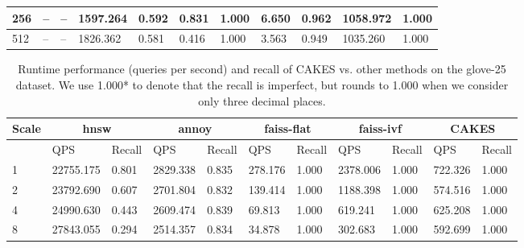 \begin{table}[!t]
\begin{center}
\begin{small}
\begin{sc}
\begin{tabular}{|l|p{1cm}|p{1cm}|p{1cm}|p{1cm}|p{1cm}|p{1cm}|p{1cm}|p{1cm}|p{1cm}|p{1cm}|}
                    \hline
                    256 & -- & -- & 1597.264 & 0.592 & 0.831 & 1.000 & 6.650 & 0.962 & 1058.972 & 1.000 \\
                    \hline
                    512 & -- & -- & 1826.362 & 0.581 & 0.416 & 1.000 & 3.563 & 0.949 & 1035.260 & 1.000 \\
                    \hline
                \end{tabular}
            \end{sc}
        \end{small}
    \end{center}
    \vskip -0.1in
\end{table}


\begin{table}[!t]
    \caption{Runtime performance (queries per second) and recall of CAKES vs. other methods on the glove-25 dataset. We use 1.000* to denote that the recall is imperfect, but rounds to 1.000 when we consider only three decimal places.}
    \label{table:results:ann-fashion}
    \vskip 0.15in
    \begin{center}
        \begin{small}
            \begin{sc}
                \begin{tabular}{|l|p{1cm}|p{1cm}|p{1cm}|p{1cm}|p{1cm}|p{1cm}|p{1cm}|p{1cm}|p{1cm}|p{1cm}|}
                    \hline
                    \textbf{Scale}  & \multicolumn{2}{|c|}{\textbf{hnsw}} & \multicolumn{2}{|c|}{\textbf{annoy}} & \multicolumn{2}{|c|}{\textbf{faiss-flat}} & \multicolumn{2}{|c|}{\textbf{faiss-ivf}}  & \multicolumn{2}{|c|}{\textbf{CAKES}} \\
                    \hline
                    &             QPS & Recall        & QPS & Recall      & QPS & Recall       & QPS & Recall     & QPS & Recall    \\
                    \hline
                    1 & 22755.175 & 0.801 & 2829.338 & 0.835 & 278.176 & 1.000 & 2378.006 & 1.000 & 722.326 & 1.000 \\
                    \hline
                    2 & 23792.690 & 0.607 & 2701.804 & 0.832 & 139.414 & 1.000 & 1188.398 & 1.000 & 574.516 & 1.000 \\
                    \hline
                    4 & 24990.630 & 0.443 & 2609.474 & 0.839 & 69.813 & 1.000 & 619.241 & 1.000 & 625.208 & 1.000 \\
                    \hline
                    8 & 27843.055 & 0.294 & 2514.357 & 0.834 & 34.878 & 1.000 & 302.683 & 1.000 & 592.699 & 1.000 \\

\end{tabular}
\end{sc}
\end{small}
\end{center}
\end{table}
